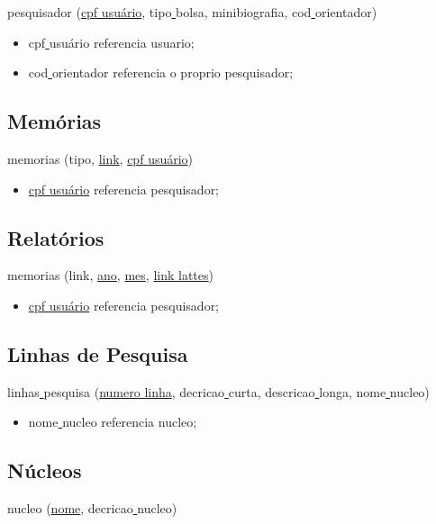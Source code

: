 \documentclass[11pt]{../../classes/ifscarticle}
\begin{document}
pesquisador (\underline{cpf\underline{ }\underline{ }usuário},
tipo\underline{ }\underline{ }bolsa,
minibiografia,
cod\underline{ }\underline{ }orientador)

\begin{itemize}
    \item cpf\underline{ }\underline{ }usuário referencia usuario;
    \item cod\underline{ }\underline{ }orientador referencia o proprio pesquisador;
\end{itemize}

\subsection{Memórias}
memorias (tipo,
\underline{link},
\underline{cpf\underline{ }\underline{ }usuário})

\begin{itemize}
    \item \underline{cpf\underline{ }\underline{ }usuário} referencia pesquisador;
\end{itemize}

\subsection{Relatórios}
memorias (link,
\underline{ano},
\underline{mes},
\underline{link\underline{ }\underline{ }lattes})

\begin{itemize}
    \item \underline{cpf\underline{ }\underline{ }usuário} referencia pesquisador;
\end{itemize}
\subsection{Linhas de Pesquisa}
linhas\underline{ }\underline{ }pesquisa (\underline{numero\underline{ }\underline{ }linha},
decricao\underline{ }\underline{ }curta,
descricao\underline{ }\underline{ }longa,
nome\underline{ }\underline{ }nucleo)


\begin{itemize}
    \item nome\underline{ }\underline{ }nucleo referencia nucleo;
\end{itemize}

\subsection{Núcleos}
nucleo (\underline{nome}, decricao\underline{ }\underline{ }nucleo)
\end{document}
